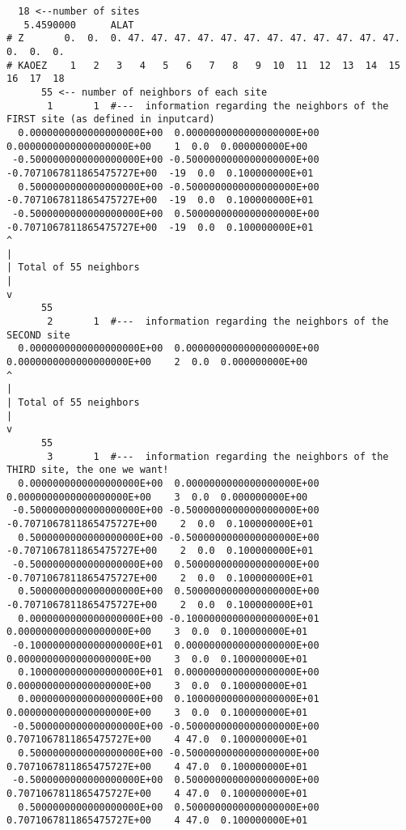 \documentclass[a4paper,10pt,fullpage]{report}
\begin{document}
\begin{verbatim}
  18 <--number of sites
   5.4590000      ALAT
# Z       0.  0.  0. 47. 47. 47. 47. 47. 47. 47. 47. 47. 47. 47. 47.  0.  0.  0.
# KAOEZ    1   2   3   4   5   6   7   8   9  10  11  12  13  14  15  16  17  18
      55 <-- number of neighbors of each site
       1       1  #---  information regarding the neighbors of the FIRST site (as defined in inputcard)
  0.0000000000000000000E+00  0.0000000000000000000E+00  0.0000000000000000000E+00    1  0.0  0.000000000E+00
 -0.5000000000000000000E+00 -0.5000000000000000000E+00 -0.7071067811865475727E+00  -19  0.0  0.100000000E+01
  0.5000000000000000000E+00 -0.5000000000000000000E+00 -0.7071067811865475727E+00  -19  0.0  0.100000000E+01
 -0.5000000000000000000E+00  0.5000000000000000000E+00 -0.7071067811865475727E+00  -19  0.0  0.100000000E+01
^
|
| Total of 55 neighbors
|
v
      55
       2       1  #---  information regarding the neighbors of the SECOND site 
  0.0000000000000000000E+00  0.0000000000000000000E+00  0.0000000000000000000E+00    2  0.0  0.000000000E+00
^
|
| Total of 55 neighbors
|
v
      55
       3       1  #---  information regarding the neighbors of the THIRD site, the one we want!
  0.0000000000000000000E+00  0.0000000000000000000E+00  0.0000000000000000000E+00    3  0.0  0.000000000E+00
 -0.5000000000000000000E+00 -0.5000000000000000000E+00 -0.7071067811865475727E+00    2  0.0  0.100000000E+01
  0.5000000000000000000E+00 -0.5000000000000000000E+00 -0.7071067811865475727E+00    2  0.0  0.100000000E+01
 -0.5000000000000000000E+00  0.5000000000000000000E+00 -0.7071067811865475727E+00    2  0.0  0.100000000E+01
  0.5000000000000000000E+00  0.5000000000000000000E+00 -0.7071067811865475727E+00    2  0.0  0.100000000E+01
  0.0000000000000000000E+00 -0.1000000000000000000E+01  0.0000000000000000000E+00    3  0.0  0.100000000E+01
 -0.1000000000000000000E+01  0.0000000000000000000E+00  0.0000000000000000000E+00    3  0.0  0.100000000E+01
  0.1000000000000000000E+01  0.0000000000000000000E+00  0.0000000000000000000E+00    3  0.0  0.100000000E+01
  0.0000000000000000000E+00  0.1000000000000000000E+01  0.0000000000000000000E+00    3  0.0  0.100000000E+01
 -0.5000000000000000000E+00 -0.5000000000000000000E+00  0.7071067811865475727E+00    4 47.0  0.100000000E+01
  0.5000000000000000000E+00 -0.5000000000000000000E+00  0.7071067811865475727E+00    4 47.0  0.100000000E+01
 -0.5000000000000000000E+00  0.5000000000000000000E+00  0.7071067811865475727E+00    4 47.0  0.100000000E+01
  0.5000000000000000000E+00  0.5000000000000000000E+00  0.7071067811865475727E+00    4 47.0  0.100000000E+01

\end{verbatim}
\end{document}

